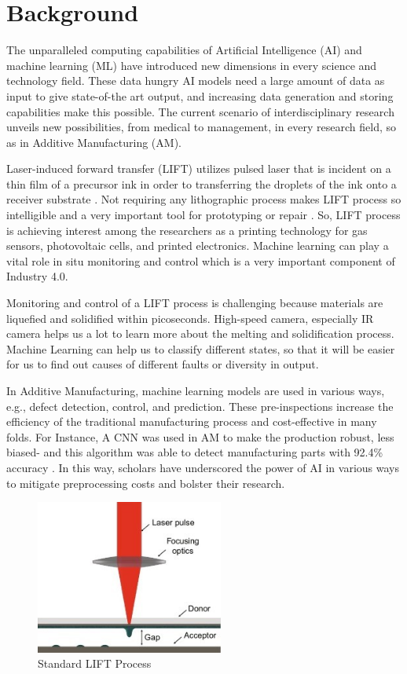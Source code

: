\documentclass[letterpaper]{article}
\begin{document}
\section*{Background}
The unparalleled computing capabilities of Artificial Intelligence (AI) and machine learning (ML) have introduced new dimensions in every science and technology field. These data hungry AI models need a large amount of data as input to give state-of-the art output, and increasing data generation and storing capabilities make this possible. The current scenario of interdisciplinary research unveils new possibilities, from medical to management, in every research field, so as in Additive Manufacturing (AM).
\par
Laser-induced forward transfer (LIFT) utilizes pulsed laser that is incident on a thin film of a precursor ink in order to transferring the droplets of the ink onto a receiver substrate \parencite[]{pradas}. Not requiring any lithographic process makes LIFT process so intelligible and a very important tool for prototyping or repair \parencite[]{arnold}. So, LIFT process is achieving interest among the researchers as a printing technology for gas sensors, photovoltaic cells, and printed electronics. Machine learning can play a vital role in situ monitoring and control which is a very important component of Industry 4.0.
\par
Monitoring and control of a LIFT process is challenging because materials are liquefied and solidified within picoseconds. High-speed camera, especially IR camera helps us a lot to learn more about the melting and solidification process. Machine Learning can help us to classify different states, so that it will be easier for us to find out causes of different faults or diversity in output.
\par
In Additive Manufacturing, machine learning models are used in various ways, e.g., defect detection, control, and prediction. These pre-inspections increase the efficiency of the traditional manufacturing process and cost-effective in many folds. For Instance, A CNN was used in AM to make the production robust, less biased- and this algorithm was able to detect manufacturing parts with 92.4\% accuracy \parencite[]{cui}. In this way, scholars have underscored the power of AI in various ways to mitigate preprocessing costs and bolster their research.
\par
\begin{figure}[h!]
  \centering
  \includegraphics[width=175pt]{images/fig1.jpg}
  \caption{Standard LIFT Process \parencite[]{morales}}
  \label{fig:stdlift}
\end{figure}
\end{document}

